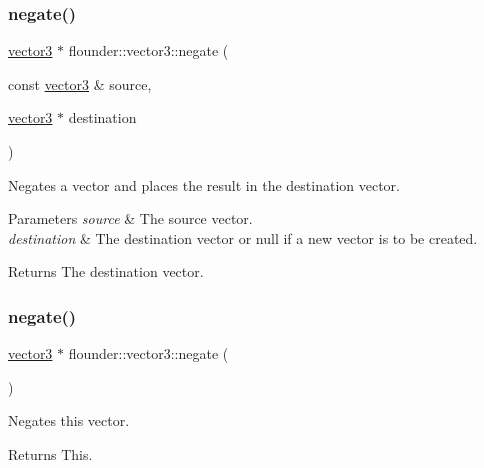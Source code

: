 \subsubsection{\texorpdfstring{negate()}{negate()}\hspace{0.1cm}{\footnotesize\ttfamily [1/2]}}
{\footnotesize\ttfamily \hyperlink{classflounder_1_1vector3}{vector3} $\ast$ flounder\+::vector3\+::negate (\begin{DoxyParamCaption}\item[{const \hyperlink{classflounder_1_1vector3}{vector3} \&}]{source,  }\item[{\hyperlink{classflounder_1_1vector3}{vector3} $\ast$}]{destination }\end{DoxyParamCaption})\hspace{0.3cm}{\ttfamily [static]}}



Negates a vector and places the result in the destination vector. 


\begin{DoxyParams}{Parameters}
{\em source} & The source vector. \\
\hline
{\em destination} & The destination vector or null if a new vector is to be created. \\
\hline
\end{DoxyParams}
\begin{DoxyReturn}{Returns}
The destination vector. 
\end{DoxyReturn}
\mbox{\label{classflounder_1_1vector3_a44cff187eea36ab0e0790e76f82fcc5d}} 
\subsubsection{\texorpdfstring{negate()}{negate()}\hspace{0.1cm}{\footnotesize\ttfamily [2/2]}}
{\footnotesize\ttfamily \hyperlink{classflounder_1_1vector3}{vector3} $\ast$ flounder\+::vector3\+::negate (\begin{DoxyParamCaption}{ }\end{DoxyParamCaption})}



Negates this vector. 

\begin{DoxyReturn}{Returns}
This. 
\end{DoxyReturn}
\mbox{\label{classflounder_1_1vector3_aedfa53c941fa5fe61d738c6d5c9fb47e}} 
